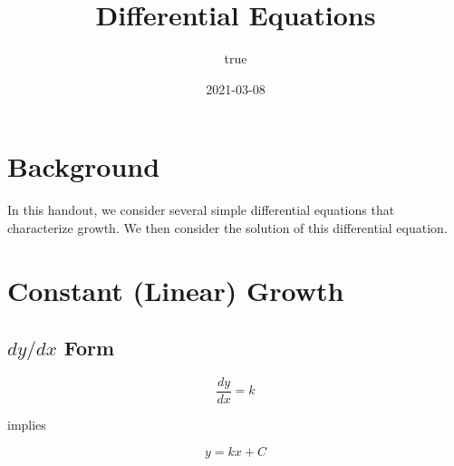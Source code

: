 \documentclass[]{tufte-handout}
\title{Differential Equations}
\author{true}
\date{2021-03-08}
\begin{document}
\maketitle



{
\setcounter{tocdepth}{2}
\tableofcontents
}

\hypertarget{background}{%
\section{Background}\label{background}}

In this handout, we consider several simple differential equations that
characterize growth. We then consider the solution of this differential
equation.

\hypertarget{constant-linear-growth}{%
\section{Constant (Linear) Growth}\label{constant-linear-growth}}

\hypertarget{dydx-form}{%
\subsection{\texorpdfstring{\(dy/dx\)
Form}{dy/dx Form}}\label{dydx-form}}

\[\frac{dy}{dx} = k\]

implies

\[y = kx + C\]
\end{document}
